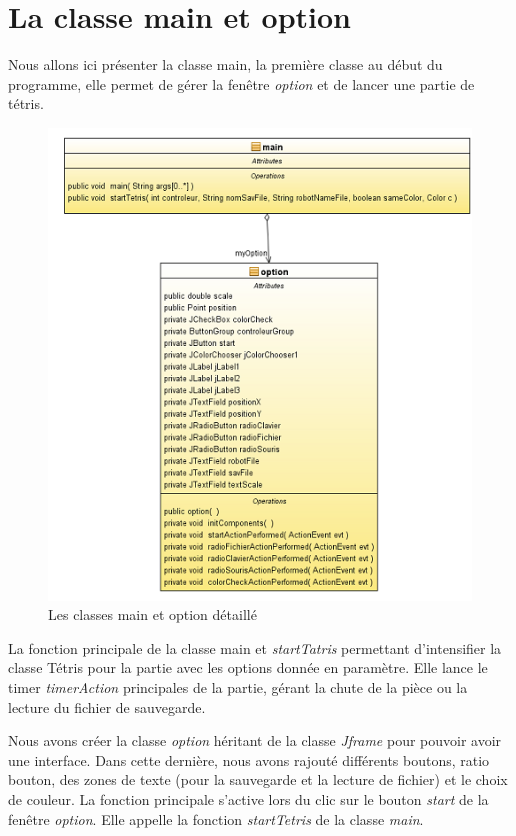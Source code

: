 \documentclass{article}           %
\begin{document}
\section{La classe main et option}
Nous allons ici présenter la classe main, la première classe au début du programme, elle permet de gérer la fenêtre \emph{option} et de lancer une partie de tétris.
\newpage
\begin{figure}[h]
   \caption{Les classes main et option détaillé }
   \includegraphics{diagramMain.png}
\end{figure}

\newpage
La fonction principale de la classe main et \emph{startTatris} permettant d'intensifier la classe Tétris pour la partie avec les options donnée en paramètre. Elle lance le timer \emph{timerAction} principales de la partie, gérant la chute de la pièce ou la lecture du fichier de sauvegarde.

Nous avons créer la classe \emph{option} héritant de la classe \emph{Jframe} pour pouvoir avoir une interface. Dans cette dernière, nous avons rajouté différents boutons, ratio bouton, des zones de texte (pour la sauvegarde et la lecture de fichier) et le choix de couleur.
La fonction principale s'active lors du clic sur le bouton \emph{start} de la fenêtre \emph{option}. Elle appelle la fonction \emph{startTetris} de la classe \emph{main}.
\end{document}
